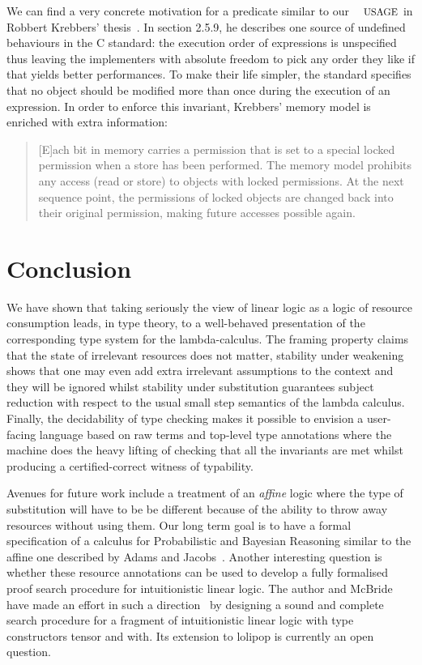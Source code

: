 \documentclass[a4paper,UKenglish]{lipics-v2016}
\begin{document}
We can find a very concrete motivation for a predicate similar to
our $\Usage{}$ in Robbert Krebbers' thesis~\cite{krebbers2015thesis}.
In section 2.5.9, he describes one source of undefined behaviours
in the C standard: the execution order of expressions is unspecified
thus leaving the implementers with absolute freedom to pick any order
they like if that yields better performances. To make their life
simpler, the standard specifies that no object should be modified
more than once during the execution of an expression. In order to
enforce this invariant, Krebbers' memory model is enriched with extra
information:
\begin{quote}
  [E]ach bit in memory carries a permission that is set to a special
  locked permission when a store has been performed. The memory
  model prohibits any access (read or store) to objects with locked
  permissions. At the next sequence point, the permissions of locked
  objects are changed back into their original permission, making
  future accesses possible again.
\end{quote}

\section{Conclusion}

We have shown that taking seriously the view of linear logic as a
logic of resource consumption leads, in type theory, to a well-behaved
presentation of the corresponding type system for the lambda-calculus.
The framing property claims that the state of irrelevant resources does
not matter, stability under weakening shows that one may even add extra
irrelevant assumptions to the context and they will be ignored whilst
stability under substitution guarantees subject reduction with respect
to the usual small step semantics of the lambda calculus. Finally, the
decidability of type checking makes it possible to envision a user-facing
language based on raw terms and top-level type annotations where the
machine does the heavy lifting of checking that all the invariants are
met whilst producing a certified-correct witness of typability.

Avenues for future work include a treatment of an \emph{affine} logic
where the type of substitution will have to be be different because
of the ability to throw away resources without using them. Our long
term goal is to have a formal specification of a calculus for Probabilistic
and Bayesian Reasoning similar to the affine one described by Adams
and Jacobs~\cite{Adams2015Type}.
Another interesting question is whether these resource annotations
can be used to develop a fully formalised proof search procedure for
intuitionistic linear logic. The author and McBride have made an effort
in such a direction~\cite{Allais2015Proof} by designing a sound and
complete search procedure for a fragment of intuitionistic linear logic
with type constructors tensor and with. Its extension to lolipop is
currently an open question.
\end{document}
